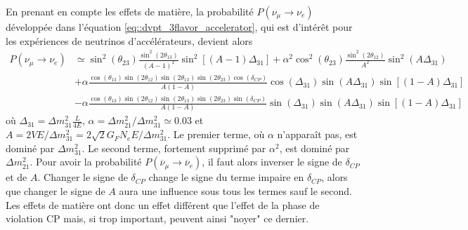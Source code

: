             En prenant en compte les effets de matière, la probabilité $P(\nu_{\mu}\to\nu_e)$ développée dans l'équation \eqref{eq::dvpt_3flavor_accelerator}, qui est d'intérêt pour les expériences de neutrinos d'accélérateurs, devient alors\cite{Giganti2017}
            \begin{equation}\label{eq::proba_matter_3flavors}
	            \begin{split}
	            P(\nu_{\mu}\to\nu_e) & \simeq  \sin^2(\theta_{23})\frac{\sin^2(2\theta_{13})}{(A-1)^2}\sin^2\left[(A-1)\Delta_{31}\right]
	            + \alpha^2\cos^2(\theta_{23})\frac{\sin^2(2\theta_{12})}{A^2}\sin^2\left(A\Delta_{31}\right) \\ 
	            & + \alpha\frac{\cos(\theta_{13})\sin(2\theta_{12})\sin(2\theta_{13})\sin(2\theta_{23})\cos(\delta_{CP})}{A(1-A)}\cos\left(\Delta_{31}\right)\sin\left(A\Delta_{31}\right)\sin\left[(1-A)\Delta_{31}\right] \\
	            & - \alpha\frac{\cos(\theta_{13})\sin(2\theta_{12})\sin(2\theta_{13})\sin(2\theta_{23})\sin(\delta_{CP})}{A(1-A)}\sin\left(\Delta_{31}\right)\sin\left(A\Delta_{31}\right)\sin\left[(1-A)\Delta_{31}\right]
	            \end{split}
            \end{equation}
            où $\Delta_{31}=\Delta m^2_{31}\frac{L}{4E}$, $\alpha=\Delta m^2_{21}/\Delta m^2_{31}\simeq 0.03$  et $A=2VE/\Delta m^2_{31}=2\sqrt{2}G_F N_eE/\Delta m^2_{31}$. Le premier terme, où $\alpha$ n'apparaît pas, est dominé par $\Delta m^2_{31}$. Le second terme, fortement supprimé par $\alpha^2$, est dominé par $\Delta m^2_{21}$. Pour avoir la probabilité $P(\overline{\nu}_{\mu}\to\overline{\nu}_e)$, il faut alors inverser le signe de $\delta_{CP}$ et de $A$. Changer le signe de $\delta_{CP}$ change le signe du terme impaire en $\delta_{CP}$, alors que changer le signe de $A$ aura une influence sous tous les termes sauf le second. Les effets de matière ont donc un effet différent que l'effet de la phase de violation CP mais, si trop important, peuvent ainsi "noyer" ce dernier.

